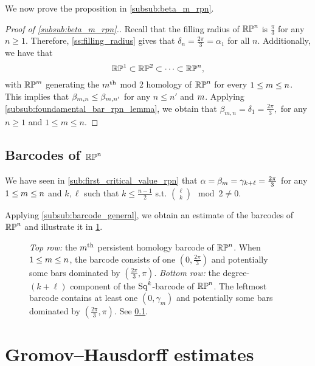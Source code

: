 \subsubsection{} 
We now prove the proposition in \cref{subsub:beta_m_rpn}.

\begin{proof}[Proof of \cref{subsub:beta_m_rpn}.]
        Recall that the filling radius of $\mathbb{RP}^n$ is $\frac{\pi}{3}$ for any $n \geq 1$.
        Therefore, \cref{ss:filling_radius} gives that $\delta_n = \tfrac{2\pi}{3} = \alpha_1$ for all $n$.
        Additionally, we have that
        \[
        \mathbb{RP}^1 \subset \mathbb{RP}^2 \subset \dots \subset \mathbb{RP}^n,
        \]
        with $\mathbb{RP}^m$ generating the $m^{\mathrm{th}}$ mod 2 homology of $\mathbb{RP}^n$ for every $1 \leq m \leq n$.
        This implies that $\beta_{m, n} \leq \beta_{m, n'}$ for any $n\leq n'$ and $m$.
        Applying \cref{subsub:foundamental_bar_rpn_lemma}, we obtain that $\beta_{m,n} = \delta_1 = \tfrac{2\pi}{3},$ for any $n\geq 1$ and $1 \leq m \leq n$.
\end{proof}


\subsection{Barcodes of $\mathbb{RP}^n$}
\label{sub:barcode_rpn}

We have seen in \cref{sub:first_critical_value_rpn} that $\alpha = \beta_m = \gamma_{k+\ell} = \tfrac{2\pi}{3}$ for any $1 \leq m \leq n$ and $k, \ell$ such that $k \leq \frac{n-1}{2}$ s.t. $\binom{\ell}{k} \mod 2\neq 0$. 

Applying \cref{subsub:barcode_general}, we obtain an estimate of the barcodes of $\mathbb{RP}^n$ and illustrate it in \cref{fig:sq barcodes}.

\begin{figure}
	\centering
	
	\caption{\emph{Top row:} the $m^{\mathrm{th}}$ persistent homology barcode of $\mathbb{RP}^n$. 
    When $1\leq m \leq n$, the barcode consists of one $(0,\frac{2\pi}{3})$ and potentially some bars dominated by $(\frac{2\pi}{3}, \pi)$.
    \emph{Bottom row:} the degree-$(k+\ell)$ component of the $\operatorname{Sq}^k$-barcode of $\mathbb{RP}^n$. 
    The leftmost barcode contains at least one $(0,\gamma_m)$ and potentially some bars dominated by $(\frac{2\pi}{3}, \pi)$.
    See \cref{sub:barcode_rpn}. 
    }
	\label{fig:sq barcodes}
\end{figure}


\section{Gromov--Hausdorff estimates}\label{prop:db estimate}

